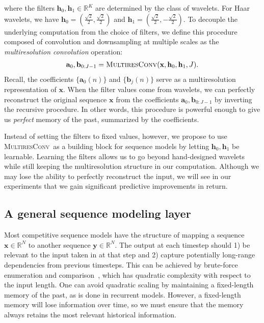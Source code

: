 \documentclass{article}
\newcommand{\reals}{\mathbb{R}}
\theoremstyle{plain}
\theoremstyle{definition}
\theoremstyle{remark}
\newcommand{\ourconv}{\textsc{MultiresConv}}
\begin{document}
where the filters $\mathbf h_0, \mathbf h_1 \in \reals^{K}$ are determined by the class of wavelets. 
For Haar wavelets, we have $\mathbf h_0 = (\frac{\sqrt{2}}{2}, \frac{\sqrt{2}}{2})$ and $\mathbf h_1 = (\frac{\sqrt{2}}{2}, -\frac{\sqrt{2}}{2})$. 
To decouple the underlying computation from the choice of filters, 
we define this procedure composed of convolution and downsampling at multiple scales as the \emph{multiresolution convolution} operation:
\begin{align}
\mathbf a_0, \mathbf b_{0:J-1} = \textsc{MultiresConv}(\mathbf x, \mathbf h_0, \mathbf h_1, J).
 \label{eq:multires-conv}
\end{align}
Recall, the coefficients $\{\mathbf a_{0}(n)\}$ and $\{\mathbf b_{j}(n)\}$ 
serve as a multiresolution representation of $\mathbf x$.  When the filter values come from wavelets, we can perfectly reconstruct the original sequence $\mathbf x$ from the coefficients $\mathbf a_0, \mathbf b_{0:J-1}$ by inverting the recursive procedure.
In other words, this procedure is powerful enough to give us \emph{perfect} memory of the past, summarized by the coefficients.

Instead of setting the filters to fixed values, however, we propose to use \ourconv\ as a building block for sequence models by letting $\mathbf h_0, \mathbf h_1$ be learnable.
Learning the filters allows us to go beyond hand-designed wavelets while still keeping the multiresolution structure in our computation. 
Although we may lose the ability to perfectly reconstruct the input, we will see in our experiments that we gain significant predictive improvements in return.


\subsection{A general sequence modeling layer}

Most competitive sequence models have the structure of mapping a sequence $\mathbf x\in \reals^N$ to another sequence $\mathbf y \in \reals^N$. 
The output at each timestep should 1) be relevant to the input taken in at that step and 2) capture potentially long-range dependencies from previous timesteps. 
This can be achieved by brute-force enumeration and comparison~\citep{vaswani2017attention}, which has quadratic complexity with respect to the input length. 
One can avoid quadratic scaling by maintaining a fixed-length memory of the past, as is done in recurrent models.  
However, a fixed-length memory will lose information over time, so we must ensure that the memory always retains the most relevant historical information.
\end{document}
